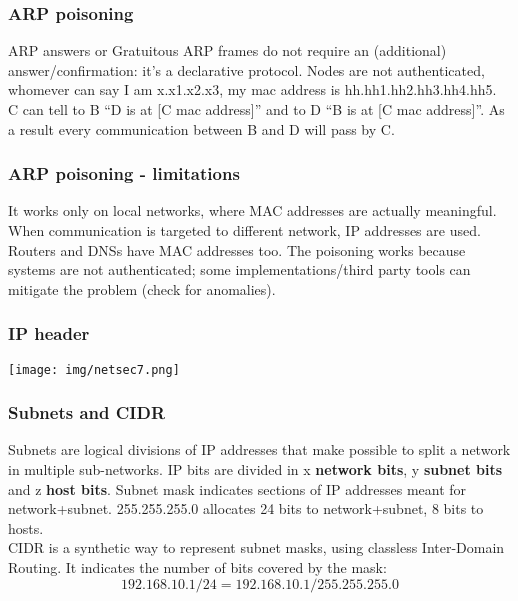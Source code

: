 \documentclass[a4paper, 10pt, titlepage]{article}
\begin{document}
\subsubsection{ARP poisoning}
ARP answers or Gratuitous ARP frames do not require an (additional) answer/confirmation: it’s a declarative protocol. Nodes are not authenticated, whomever can say I am x.x1.x2.x3, my mac address is hh.hh1.hh2.hh3.hh4.hh5.\\
C can tell to B “D is at [C mac address]” and to D “B is at [C mac address]”. As a result every communication between B and D will pass by C.
\subsubsection*{ARP poisoning - limitations}
It works only on local networks, where MAC addresses are actually meaningful. When communication is targeted to different network, IP addresses are used. Routers and DNSs have MAC addresses too. The poisoning works because systems are not authenticated; some implementations/third party tools can mitigate the problem (check for anomalies).

\subsubsection*{IP header}
\begin{center}
	\texttt{[image: img/netsec7.png]}
\end{center}

\subsubsection*{Subnets and CIDR}
Subnets are logical divisions of IP addresses that make possible to split a network in multiple sub-networks. IP bits are divided in x \textbf{network bits}, y \textbf{subnet bits} and z \textbf{host bits}. Subnet mask indicates sections of IP addresses meant for network+subnet. 255.255.255.0 allocates 24 bits to network+subnet, 8 bits to hosts. \\
CIDR is a synthetic way to represent subnet masks, using classless Inter-Domain Routing. It indicates the number of bits covered by the mask:
 $$192.168.10.1/24 = 192.168.10.1/255.255.255.0$$
 
\end{document}
